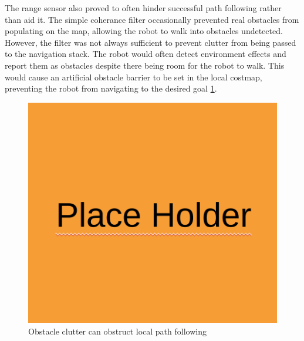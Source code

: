 The range sensor also proved to often hinder successful path following rather than aid it. The simple coherance filter occasionally prevented real obstacles from populating on the map, allowing the robot to walk into obstacles undetected. However, the filter was not always sufficient to prevent clutter from being passed to the navigation stack. The robot would often detect environment effects and report them as obstacles despite there being room for the robot to walk. This would cause an artificial obstacle barrier to be set in the local costmap, preventing the robot from navigating to the desired goal \ref{fig:clutter_barrier}. 

\begin{figure}[H]
    \centerline{\includegraphics[scale=0.25]{place_holder.png}}
    \caption{Obstacle clutter can obstruct local path following}
    \label{fig:clutter_barrier}
\end{figure}

